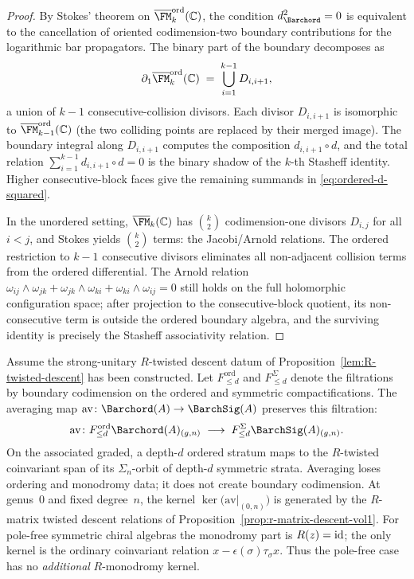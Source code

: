 \begin{proof}
By Stokes' theorem on
$\overline{\FM}_k^{\mathrm{ord}}(\mathbb{C})$, the condition
$d_{\Barchord}^2 = 0$ is equivalent to the cancellation of oriented
codimension-two boundary contributions for the logarithmic bar
propagators. The binary part of the boundary decomposes as
\[
\partial_1\overline{\FM}_k^{\mathrm{ord}}(\mathbb{C})
\;=\;
\bigcup_{i=1}^{k-1} D_{i,i+1},
\]
a union of $k{-}1$ consecutive-collision divisors. Each divisor
$D_{i,i+1}$ is isomorphic to
$\overline{\FM}_{k-1}^{\mathrm{ord}}(\mathbb{C})$
(the two colliding points are replaced by their merged image).
The boundary integral along $D_{i,i+1}$ computes the composition
$d_{i,i+1} \circ d$, and the total relation
$\sum_{i=1}^{k-1} d_{i,i+1} \circ d = 0$
is the binary shadow of the $k$-th Stasheff identity. Higher
consecutive-block faces give the remaining summands in
\eqref{eq:ordered-d-squared}.

In the unordered setting, $\overline{\FM}_k(\mathbb{C})$ has
$\binom{k}{2}$ codimension-one divisors $D_{i,j}$ for all
$i < j$, and Stokes yields $\binom{k}{2}$ terms:
the Jacobi/Arnold relations. The ordered restriction to
$k{-}1$ consecutive divisors eliminates all non-adjacent
collision terms from the ordered differential. The Arnold relation
$\omega_{ij} \wedge \omega_{jk} + \omega_{jk} \wedge \omega_{ki}
+ \omega_{ki} \wedge \omega_{ij} = 0$
still holds on the full holomorphic configuration space; after
projection to the consecutive-block quotient, its non-consecutive term
is outside the ordered boundary algebra, and the surviving identity is
precisely the Stasheff associativity relation.
\end{proof}

\begin{proposition}
\ClaimStatusProvedHere
\label{prop:averaging-surplus}
Assume the strong-unitary $R$-twisted descent datum of
Proposition~\ref{lem:R-twisted-descent} has been constructed. Let
$F_{\leq d}^{\mathrm{ord}}$ and $F_{\leq d}^{\Sigma}$ denote the
filtrations by boundary codimension on the ordered and symmetric
compactifications. The averaging map
$\mathrm{av}\colon\Barchord(A) \to \BarchSig(A)$ preserves this
filtration:
\[
\mathrm{av}\colon
F_{\leq d}^{\mathrm{ord}}\Barchord(A)_{(g,n)}
\;\longrightarrow\;
F_{\leq d}^{\Sigma}\BarchSig(A)_{(g,n)}.
\]
On the associated graded, a depth-$d$ ordered stratum maps to the
$R$-twisted coinvariant span of its $\Sigma_n$-orbit of depth-$d$
symmetric strata. Averaging loses ordering and monodromy data; it
does not create boundary codimension. At genus~$0$ and fixed
degree~$n$, the kernel
$\ker\bigl(\mathrm{av}|_{(0,n)}\bigr)$ is generated by the $R$-matrix
twisted descent relations of
Proposition~\textup{\ref{prop:r-matrix-descent-vol1}}.
For pole-free symmetric chiral algebras the monodromy part is
$R(z)=\mathrm{id}$; the only kernel is the ordinary coinvariant relation
$x-\epsilon(\sigma)\tau_\sigma x$. Thus the pole-free case has no
\emph{additional} $R$-monodromy kernel.
\end{proposition}

